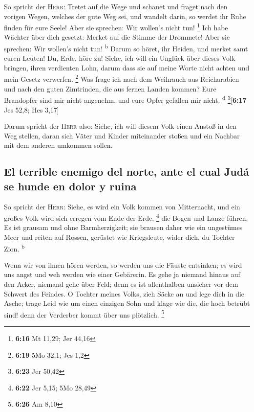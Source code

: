  So spricht der \textsc{Herr}: Tretet auf die Wege und
schauet und fraget nach den vorigen Wegen, welches der gute Weg sei, und
wandelt darin, so werdet ihr Ruhe finden für eure Seele! Aber sie
sprechen: Wir wollen's nicht tun! \footnote{\textbf{6:16} Mt 11,29; Jer
  44,16}  Ich habe Wächter über dich gesetzt: Merket auf
die Stimme der Drommete! Aber sie sprechen: Wir wollen's nicht tun!
\textsuperscript{b}  Darum so höret, ihr Heiden, und
merket samt euren Leuten!  Du, Erde, höre zu! Siehe, ich
will ein Unglück über dieses Volk bringen, ihren verdienten Lohn, darum
dass sie auf meine Worte nicht achten und mein Gesetz verwerfen.
\footnote{\textbf{6:19} 5Mo 32,1; Jes 1,2}  Was frage ich
nach dem Weihrauch aus Reicharabien und nach den guten Zimtrinden, die
aus fernen Landen kommen? Eure Brandopfer sind mir nicht angenehm, und
eure Opfer gefallen mir nicht. \textsuperscript{d}
\footnote{\textbf{6:23} Jer 50,42}{[}\textbf{6:17} Jes 52,8; Hes 3,17{]}

 Darum spricht der \textsc{Herr} also: Siehe, ich will
diesem Volk einen Anstoß in den Weg stellen, daran sich Väter und Kinder
miteinander stoßen und ein Nachbar mit dem anderen umkommen sollen.

\hypertarget{el-terrible-enemigo-del-norte-ante-el-cual-juduxe1-se-hunde-en-dolor-y-ruina}{%
\subsection{El terrible enemigo del norte, ante el cual Judá se hunde en
dolor y
ruina}\label{el-terrible-enemigo-del-norte-ante-el-cual-juduxe1-se-hunde-en-dolor-y-ruina}}

 So spricht der \textsc{Herr}: Siehe, es wird ein Volk
kommen von Mitternacht, und ein großes Volk wird sich erregen vom Ende
der Erde, \footnote{\textbf{6:22} Jer 5,15; 5Mo 28,49} 
die Bogen und Lanze führen. Es ist grausam und ohne Barmherzigkeit; sie
brausen daher wie ein ungestümes Meer und reiten auf Rossen, gerüstet
wie Kriegsleute, wider dich, du Tochter Zion. \textsuperscript{b}

 Wenn wir von ihnen hören werden, so werden uns die
Fäuste entsinken; es wird uns angst und weh werden wie einer Gebärerin.
 Es gehe ja niemand hinaus auf den Acker, niemand gehe
über Feld; denn es ist allenthalben unsicher vor dem Schwert des
Feindes.  O Tochter meines Volks, zieh Säcke an und lege
dich in die Asche; trage Leid wie um einen einzigen Sohn und klage wie
die, die hoch betrübt sind! denn der Verderber kommt über uns plötzlich.
\footnote{\textbf{6:26} Am 8,10}

